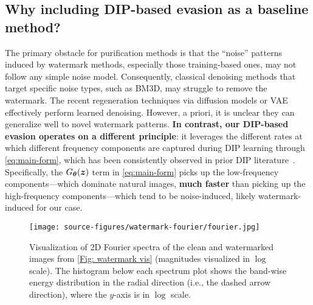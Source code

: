 \subsection{Why including DIP-based evasion as a baseline method? }
\label{sec:why-include-dip}
% 
The primary obstacle for purification methods is that the ``noise'' patterns induced by watermark methods, especially those training-based ones, may not follow any simple noise model. Consequently, classical denoising methods that target specific noise types, such as BM3D, may struggle to remove the watermark. The recent regeneration techniques via diffusion models or VAE effectively perform learned denoising. However, a priori, it is unclear they can generalize well to novel watermark patterns. \textbf{In contrast, our DIP-based evasion operates on a different principle}: it leverages the different rates at which different frequency components are captured during DIP learning through \cref{eq:main-form}, which has been consistently observed in prior DIP literature~\citep{ulyanov2018deep,DBLP_journals_ijcv_ShiMMS22,li2021self,wang2021early}. Specifically, the $G_{\boldsymbol \theta}(\boldsymbol z)$ term in \cref{eq:main-form} picks up the low-frequency components---which dominate natural images, \textbf{much faster} than picking up the high-frequency components---which tend to be noise-induced, likely watermark-induced for our case. 
\begin{SCfigure}[][!htbp]
    \texttt{[image: source-figures/watermark-fourier/fourier.jpg]}
    \caption{Visualization of 2D Fourier spectra of the clean and watermarked images from \cref{Fig: watermark vis} (magnitudes visualized in $\log$ scale). The histogram below each spectrum plot shows the band-wise energy distribution in the radial direction (i.e., the dashed arrow direction), where the $y$-axis is in $\log$ scale.}
    \label{Fig: watermark fourier vis}
    \vspace{-1em}
\end{SCfigure}
